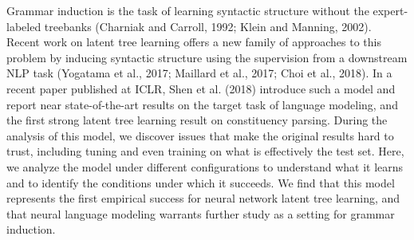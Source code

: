 Grammar induction is the task of learning syntactic structure without the expert-labeled treebanks (Charniak and Carroll, 1992; Klein and Manning, 2002). Recent work on latent tree learning offers a new family of approaches to this problem by inducing syntactic structure using the supervision from a downstream NLP task (Yogatama et al., 2017; Maillard et al., 2017; Choi et al., 2018). In a recent paper published at ICLR, Shen et al. (2018) introduce such a model and report near state-of-the-art results on the target task of language modeling, and the first strong latent tree learning result on constituency parsing. During the analysis of this model, we discover issues that make the original results hard to trust, including tuning and even training on what is effectively the test set. Here, we analyze the model under different configurations to understand what it learns and to identify the conditions under which it succeeds. We find that this model represents the first empirical success for neural network latent tree learning, and that neural language modeling warrants further study as a setting for grammar induction.
